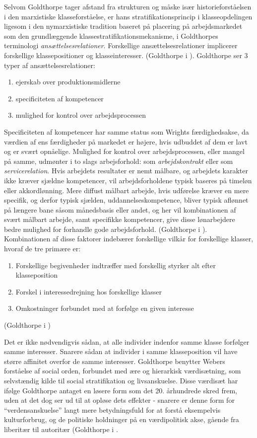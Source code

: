 Selvom Goldthorpe tager afstand fra strukturen og måske især historieforståelsen i den marxistiske klasseforståelse, er hans stratifikationsprincip i klasseopdelingen ligesom i den nymarxistiske tradition baseret på placering på arbejdsmarkedet som den grundlæggende klassestratifikationsmekanisme, i Goldthorpes terminologi \emph{ansættelsesrelationer}. Forskellige ansættelsesrelationer implicerer forskellige klassepositioner og klasseinteresser. (Goldthorpe i \parencite[92]{Harrits2014}). Goldthorpe ser 3 typer af ansættelsesrelationer:
%
\begin{enumerate}
 \item ejerskab over produktionsmidlerne
 \item specificiteten af kompetencer
 \item mulighed for kontrol over arbejdsprocessen
\end{enumerate}
%
Specificiteten af kompetencer har samme status som Wrights færdighedsakse, da værdien af ens færdigheder på markedet er højere, hvis udbuddet af dem er lavt og er svært opnåelige. Mulighed for kontrol over arbejdsprocessen, eller mangel på samme, udmønter i to slags arbejsforhold: som \emph{arbejdskontrakt} eller som \emph{servicerelation}. Hvis arbejdets resultater er nemt målbare, og arbejdets karakter ikke kræver sjældne kompetencer, vil arbejdsforholdene typisk baseres på timeløn eller akkordlønning. Mere diffust målbart arbejde, hvis udførelse kræver en mere specifik, og derfor typisk sjælden, uddannelseskompetence, bliver typisk aflønnet på længere bane såsom månedsbasis eller andet, og her vil kombinationen af svært målbart arbejde, samt specifikke kompetencer, give disse lønarbejdere bedre mulighed for forhandle gode arbejdsforhold. (Goldthorpe i \parencite[93]{Harrits2014}). Kombinationen af disse faktorer indebærer forskellige vilkår for forskellige klasser, hvoraf de tre primære er: 
%
\begin{enumerate}
 \item Forskellige begivenheder indtræffer med forskellig styrker alt efter klasseposition
 \item Forskel i interessedrejning hos forskellige klasser
 \item Omkostninger forbundet med at forfølge en given interesse
\end{enumerate}
%
(Goldthorpe i \parencite[93]{Harrits2014})

Det er ikke nødvendigvis sådan, at alle individer indenfor samme klasse forfølger samme interesser. Snarere sådan at individer i samme klasseposition vil have større affinitet overfor de samme interesser. Goldthorpe benytter Webers forståelse af social orden, forbundet med ære og hierarkisk værdisætning, som selvstændig kilde til social stratifikation og livsanskuelse. Disse værdisæt har ifølge Goldthorpe antaget en løsere form som det 20. århundrede skred frem, uden at det dog ser ud til at opløse dets effekter - snarere er denne form for “verdensanskuelse” langt mere betydningsfuld for at forstå eksempelvis kulturforbrug, og de politiske holdninger på en værdipolitisk akse, gående fra liberitær til autoritær (Goldthorpe i \parencite[95]{Harrits2014}. 

